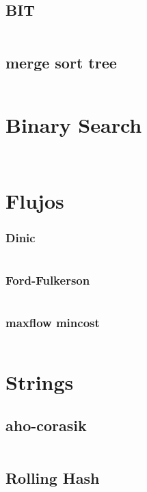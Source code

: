 \documentclass[10pt]{article}
\begin{document}
				\subsection{BIT}
					\inputminted[tabsize=2,breaklines,fontsize=\small, style=bw]{c++}{DataStructures/BIT.cpp}
				\subsection{merge sort tree}
					\inputminted[tabsize=2,breaklines,fontsize=\small, style=bw]{c++}{DataStructures/mergeSortTree.cpp}
			\section{Binary Search}
				\inputminted[tabsize=2,breaklines,fontsize=\small, style=bw]{c++}{algorithms/binarySearch.cpp}
				\inputminted[tabsize=2,breaklines,fontsize=\small, style=bw]{c++}{algorithms/ternarySearch.cpp}
			\section{Flujos}
				\subsubsection{Dinic}
					\inputminted[tabsize=2,breaklines,fontsize=\small, style=bw]{c++}{Flows/Dinic.cpp}
				\subsubsection{Ford-Fulkerson}
					\inputminted[tabsize=2,breaklines,fontsize=\small, style=bw]{c++}{Flows/Ford-Fulkerson.cpp}
				\subsubsection{maxflow mincost}
					\inputminted[tabsize=2,breaklines,fontsize=\small, style=bw]{c++}{Flows/mincostMaxflow.cpp}
			\section{Strings}
				\subsection{aho-corasik}
					\inputminted[tabsize=2,breaklines,fontsize=\small, style=bw]{c++}{Strings/Aho-corasik.cpp}
				\subsection{Rolling Hash}
					\inputminted[tabsize=2,breaklines,fontsize=\small, style=bw]{c++}{Strings/Hash.cpp}
\end{document}
